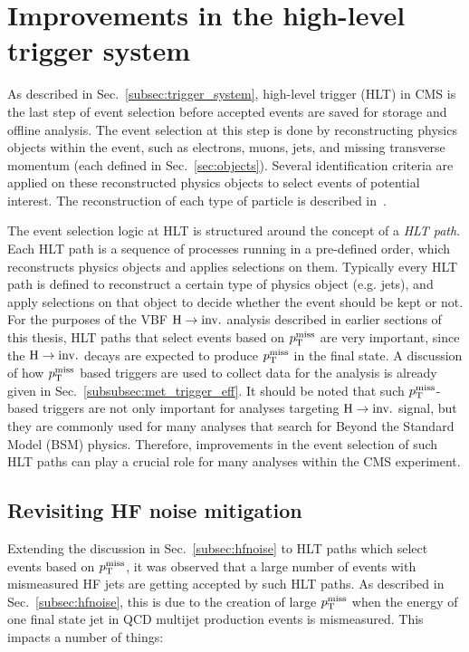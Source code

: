 \section{Improvements in the high-level trigger system}

\graphicspath{{5_Outlook/Figures}}

As described in Sec.~\ref{subsec:trigger_system}, high-level trigger (HLT) in CMS is the last step of event selection before accepted events are saved for storage
and offline analysis.
The event selection at this step is done by reconstructing physics objects within the event, such as electrons, muons, jets, 
and missing transverse momentum (each defined in Sec.~\ref{sec:objects}).
Several identification criteria are applied on these reconstructed physics objects to select events of potential interest. The reconstruction of each
type of particle is described in~\cite{cms:hlt_paper}.

The event selection logic at HLT is structured around the concept of a \textit{HLT path}. Each HLT path is a sequence of processes running in a pre-defined order, which
reconstructs physics objects and applies selections on them. Typically every HLT path is defined to reconstruct a certain type of physics object (e.g. jets), and apply
selections on that object to decide whether the event should be kept or not. For the purposes of the VBF $\textrm{H} \rightarrow \textrm{inv.}$ analysis described in earlier sections of this thesis,
HLT paths that select events based on $p_{\textrm{T}}^{\textrm{miss}}$ are very important, since the $\textrm{H} \rightarrow \textrm{inv.}$ decays are expected to produce $p_{\textrm{T}}^{\textrm{miss}}$ in the final state. A discussion of how
$p_{\textrm{T}}^{\textrm{miss}}$ based triggers are used to collect data for the analysis is already given in Sec.~\ref{subsubsec:met_trigger_eff}. It should be noted that such $p_{\textrm{T}}^{\textrm{miss}}$-based triggers
are not only important for analyses targeting $\textrm{H} \rightarrow \textrm{inv.}$ signal, but they are commonly used for many analyses that search for Beyond the Standard Model (BSM) physics. Therefore,
improvements in the event selection of such HLT paths can play a crucial role for many analyses within the CMS experiment.

\subsection{Revisiting HF noise mitigation}
\label{subsec:hf_noise_hlt}

Extending the discussion in Sec.~\ref{subsec:hfnoise} to HLT paths which select events based on $p_{\textrm{T}}^{\textrm{miss}}$, 
it was observed that a large number of events with mismeasured HF jets are getting accepted by such HLT paths. 
As described in Sec.~\ref{subsec:hfnoise}, this is due to the creation of large $p_{\textrm{T}}^{\textrm{miss}}$ when the energy of one final state jet in QCD multijet
production events is mismeasured. This impacts a number of things:

